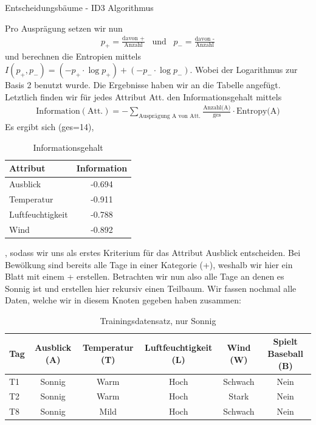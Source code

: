 \begin{task}[credit=16]{Entscheidungsbäume - ID3 Algorithmus}
\begin{subtask}[points=10,title=ID3 Algorithmus]
\begin{solution}
\begin{table}[H]
\end{table}
Pro Ausprägung setzen wir nun
\begin{align*}
p_+=\frac{\text{davon +}}{\text{Anzahl}}\;\;\; \text{und}\;\;\; p_-=\frac{\text{davon -}}{\text{Anzahl}}
\end{align*}
und berechnen die Entropien mittels $I(p_+,p_-)=(-p_+\cdot\log p_+)+(-p_-\cdot\log p_-)$. Wobei der Logarithmus zur Basis 2 benutzt wurde. Die Ergebnisse haben wir an die Tabelle angefügt. Letztlich finden wir für jedes Attribut Att. den Informationsgehalt mittels \begin{align*}
\text{Information}(\text{Att.})=-\sum_{\text{Ausprägung A von Att.}}\frac{\text{Anzahl(A)}}{\text{ges}}\cdot\text{Entropy(A)}
\end{align*}
Es ergibt sich (ges=14),
\begin{table}[H]
	\centering
	\caption{Informationsgehalt}
	\begin{tabular}{l|c}
		\toprule
		\textbf{Attribut} & \textbf{Information}  \\
		\midrule
		Ausblick & -0.694\\
		Temperatur & -0.911\\
		Luftfeuchtigkeit & -0.788\\
		Wind&-0.892\\
		\bottomrule
	\end{tabular}
\end{table}
, sodass wir uns als erstes Kriterium für das Attribut Ausblick entscheiden. Bei Bewölkung sind bereits alle Tage in einer Kategorie (+), weshalb wir hier ein Blatt mit einem + erstellen. Betrachten wir nun also alle Tage an denen es Sonnig ist und erstellen hier rekursiv einen Teilbaum. Wir fassen nochmal alle Daten, welche wir in diesem Knoten gegeben haben zusammen:
\begin{table}[H]
	\centering
	\caption{Trainingsdatensatz, nur Sonnig}
	\begin{tabular}{l|c|c|c|c|c}
		\toprule
		\textbf{Tag} & \textbf{Ausblick (A)} & \textbf{Temperatur (T)}  & \textbf{Luftfeuchtigkeit (L)} & \textbf{Wind (W)}     & \textbf{Spielt Baseball (B)} \\
		\midrule
		T1  & Sonnig    & Warm        & Hoch             & Schwach  & Nein            \\
		T2  & Sonnig    & Warm        & Hoch             & Stark    & Nein            \\
		T8  & Sonnig    & Mild        & Hoch             & Schwach  & Nein            \\

\end{tabular}
\end{table}
\end{solution}
\end{subtask}
\end{task}
